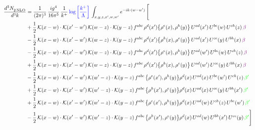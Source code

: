 \documentclass[9pt]{article}
\numberwithin{equation}{section}
\begin{document}
\begin{align}
    \frac{d^{3}N_{2\,\rm NLO}^{\rm}}{d^{3}k}  & = \frac{1}{(2\pi)^{3}}\, \frac{ig^{4}}{16\pi^{5}}\, \frac{1}{k^{+}}\, {\color{blue}\log{\left[\frac{k^{+}}{\Lambda}\right]}}\, \int_{x,y,z,x^{\prime},w,w^{\prime}}e^{-ik\cdot (w-w')}\, \Bigg[\notag \\ & +\frac{1}{2}\,\mathcal{K}(x-w)\cdot\mathcal{K}(x'-w')\,\mathcal{K}(w-z)\cdot\mathcal{K}(y-z)\, f^{abc}\,\rho^{d}(x')\big\{\rho^{e}(x),\rho^{h}(y)\big\}\,U^{ad}(x')\,U^{be}(w)\,U^{ch}(z)\,{\color{violet} \beta}\notag\\ &-\frac{1}{2}\,\mathcal{K}(x-w)\cdot\mathcal{K}(x'-w')\,\mathcal{K}(w-z)\cdot\mathcal{K}(y-z)\, f^{abc}\,\rho^{d}(x')\big\{\rho^{h}(x),\rho^{e}(y)\big\}\,U^{ad}(x')\,U^{ce}(y)\,U^{bh}(x)\,{\color{violet} \beta}\notag\\ &-\frac{1}{2}\,\mathcal{K}(x-w)\cdot\mathcal{K}(x'-w')\,\mathcal{K}(w-z)\cdot\mathcal{K}(y-z)\, f^{abc}\,\rho^{d}(x')\big\{\rho^{e}(x),\rho^{h}(y)\big\}\,U^{ad}(w')\,U^{be}(w)\,U^{ch}(z)\,{\color{violet} \beta}\notag \\ &+\frac{1}{2}\,\mathcal{K}(x-w)\cdot\mathcal{K}(x'-w')\,\mathcal{K}(w-z)\cdot\mathcal{K}(y-z)\, f^{abc}\,\rho^{d}(x')\big\{\rho^{h}(x),\rho^{e}(y)\big\}\,U^{ad}(w')\,U^{ce}(y)\,U^{bh}(x)\,{\color{violet} \beta}\notag\\
&-\frac{1}{2}\,\mathcal{K}(x-w)\cdot\mathcal{K}(x'-w')\,\mathcal{K}(w'-z)\cdot\mathcal{K}(y-z)\, f^{abc}\,\big\{\rho^{e}(x'),\rho^{h}(y)\big\}\rho^{d}(x)\,U^{ad}(x)\,U^{be}(w')\,U^{ch}(z)\,{\color{green} \beta'}\notag \\ & +\frac{1}{2}\,\mathcal{K}(x-w)\cdot\mathcal{K}(x'-w')\,\mathcal{K}(w'-z)\cdot\mathcal{K}(y-z)\, f^{abc}\,\big\{\rho^{h}(x'),\rho^{e}(y)\big\}\rho^{d}(x)\,U^{ad}(x)\,U^{ce}(y)\,U^{bh}(x')\,{\color{green} \beta'} \notag\\ & +\frac{1}{2}\,\mathcal{K}(x-w)\cdot\mathcal{K}(x'-w')\,\mathcal{K}(w'-z)\cdot\mathcal{K}(y-z)\, f^{abc}\,\big\{\rho^{e}(x'),\rho^{h}(y)\big\}\rho^{d}(x)\,U^{ad}(w)\,U^{ch}(z)\,U^{be}(w')\,{\color{green} \beta'} \notag\\
& -\frac{1}{2}\,\mathcal{K}(x-w)\cdot\mathcal{K}(x'-w')\,\mathcal{K}(w'-z)\cdot\mathcal{K}(y-z)\, f^{abc}\,\big\{\rho^{h}(x'),\rho^{e}(y)\big\}\rho^{d}(x)\,U^{ad}(w)\,U^{bh}(x')\,U^{ce}(y)\,{\color{green} \beta'}\Bigg]
\end{align}
\end{document}
